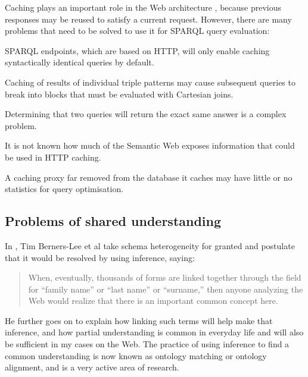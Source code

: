 Caching plays an important role in the Web architecture
\cite{Jacobs:04:AWW}, because previous responses may be reused to
satisfy a current request. However, there are many problems that need
to be solved to use it for SPARQL query evaluation:

\begin{problem}\label{prob:syntacticcache}
SPARQL endpoints, which are based on HTTP, will only enable caching
syntactically identical queries by  default.
\end{problem}

\begin{problem}\label{prob:cachecartesian}
Caching of results of individual triple patterns may cause subsequent
queries to break into blocks that must be evaluated with Cartesian joins.
\end{problem}

\begin{problem}\label{prob:queryeq}
Determining that two queries will return the exact same answer is a
complex problem.
\end{problem}

\begin{problem}\label{prob:sanity}
It is not known how much of the Semantic Web exposes information that
could be used in HTTP caching.
\end{problem}

\begin{problem}\label{prob:nostats}
A caching proxy far removed from the database it caches may have
little or no statistics for query optimisation.
\end{problem}



\subsection{Problems of shared understanding}\label{sec:semproblems}

In \cite{berners2000weaving}, Tim Berners-Lee et al take schema
heterogeneity for granted and postulate that it would be resolved by using
inference, saying:

\begin{quote}
When, eventually, thousands of forms are linked together through the
field for ``family name'' or ``last name'' or ``surname,'' then anyone
analyzing the Web would realize that there is an important common
concept here.
\end{quote}

He further goes on to explain how linking such terms will help make
that inference, and how partial understanding is common in everyday
life and will also be sufficient in my cases on the Web. The practice
of using inference to find a common understanding is now known as
ontology matching or ontology alignment, and is a very active area of
research.

